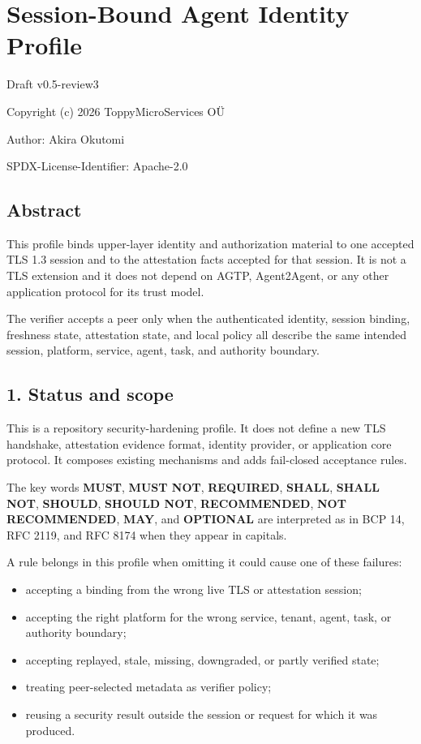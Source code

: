 \documentclass[
]{article}
\author{}
\date{}
\providecommand{\tightlist}{%
  \setlength{\itemsep}{0pt}\setlength{\parskip}{0pt}}
\begin{document}
{
\setcounter{tocdepth}{3}
\tableofcontents
}
\section{Session-Bound Agent Identity
Profile}\label{session-bound-agent-identity-profile}

Draft v0.5-review3

Copyright (c) 2026 ToppyMicroServices OÜ

Author: Akira Okutomi

SPDX-License-Identifier: Apache-2.0

\subsection{Abstract}\label{abstract}

This profile binds upper-layer identity and authorization material to
one accepted TLS 1.3 session and to the attestation facts accepted for
that session. It is not a TLS extension and it does not depend on AGTP,
Agent2Agent, or any other application protocol for its trust model.

The verifier accepts a peer only when the authenticated identity,
session binding, freshness state, attestation state, and local policy
all describe the same intended session, platform, service, agent, task,
and authority boundary.

\subsection{1. Status and scope}\label{status-and-scope}

This is a repository security-hardening profile. It does not define a
new TLS handshake, attestation evidence format, identity provider, or
application core protocol. It composes existing mechanisms and adds
fail-closed acceptance rules.

The key words \textbf{MUST}, \textbf{MUST NOT}, \textbf{REQUIRED},
\textbf{SHALL}, \textbf{SHALL NOT}, \textbf{SHOULD}, \textbf{SHOULD
NOT}, \textbf{RECOMMENDED}, \textbf{NOT RECOMMENDED}, \textbf{MAY}, and
\textbf{OPTIONAL} are interpreted as in BCP 14, RFC 2119, and RFC 8174
when they appear in capitals.

A rule belongs in this profile when omitting it could cause one of these
failures:

\begin{itemize}
\tightlist
\item
  accepting a binding from the wrong live TLS or attestation session;
\item
  accepting the right platform for the wrong service, tenant, agent,
  task, or authority boundary;
\item
  accepting replayed, stale, missing, downgraded, or partly verified
  state;
\item
  treating peer-selected metadata as verifier policy;
\item
  reusing a security result outside the session or request for which it
  was produced.
\end{itemize}
\end{document}
